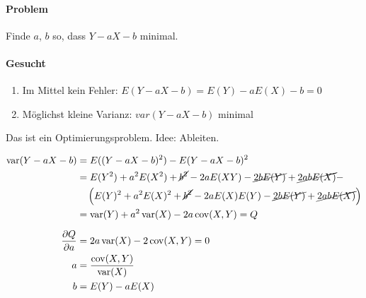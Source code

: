 \documentclass[10pt,a4paper]{scrartcl}
\newif\ifincludeExamples
\DeclareMathOperator{\var}{var}
\DeclareMathOperator{\cov}{cov}
\begin{document}
\ifincludeExamples
\paragraph{Beispiel: Wie lange muss ein Verzögerungselement sein?}

\begin{itemize}
\item Konstante Abbrand-Geschwindigkeit, d.h. linearer Zusammenhang zwischen Länge und Brenndauer. $$L = aT + b$$
\end{itemize}

Gesucht ist nun $L = aT + b + Fehler$ mit möglichst kleinem Fehler.
\fi

\paragraph{Problem} Finde $a$, $b$ so, dass $Y-aX-b$ minimal.
\paragraph{Gesucht}
\begin{enumerate}
\item Im Mittel kein Fehler: $E(Y - aX-b) = E(Y) - aE(X) - b = 0$
\item Möglichst kleine Varianz: $var(Y - aX - b)$ minimal
\end{enumerate}

Das ist ein Optimierungsproblem. Idee: Ableiten.

\begin{align*}
  \var(Y - aX - b) &= E((Y-aX-b)^2) - E(Y-aX-b)^2 \\ 
                   &= E(Y^2) + a^2E(X^2) + \cancel{b^2} - 2aE(XY) - \cancel{2bE(Y)} + \cancel{2abE(X)} - \\
                   &  \quad \left(E(Y)^2 + a^2E(X)^2 + \cancel{b^2} - 2aE(X)E(Y) - \cancel{2bE(Y)} + \cancel{2abE(X)}\right) \\
                   &=  \var(Y) + a^2\var(X) - 2a\cov(X, Y) = Q\\[0.2cm]
  \frac{\partial Q}{\partial a} &= 2a\var(X) - 2\cov(X, Y) = 0 \\
                   a &= \frac{\cov(X, Y)}{\var(X)} \\
                   b &= E(Y) - aE(X)
\end{align*}
\end{document}
